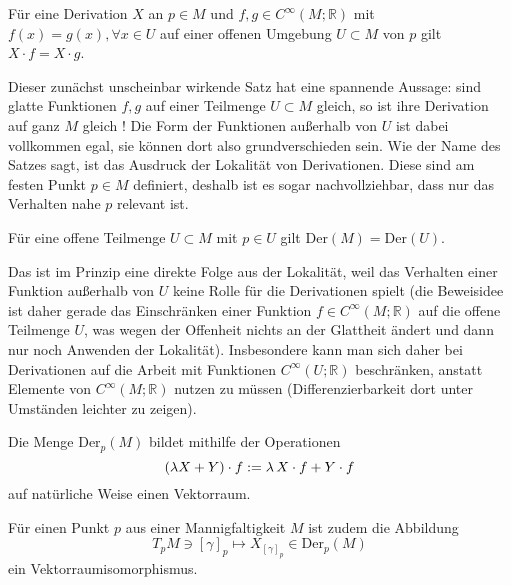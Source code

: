 \documentclass[../H_Analysis_main.tex]{subfiles}
\begin{document}
\begin{satz}[Lokalität]
Für eine Derivation $X$ an $p \in M$ und $f, g \in C^\infty(M; \mathbb{R})$ mit $f(x) = g(x), \forall x \in U$ auf einer offenen Umgebung $U \subset M$ von $p$ gilt $X \cdot f = X \cdot g$.
\end{satz}
Dieser zunächst unscheinbar wirkende Satz hat eine spannende Aussage: sind glatte Funktionen $f, g$ auf einer Teilmenge $U \subset M$ gleich, so ist ihre Derivation auf ganz $M$ gleich ! Die Form der Funktionen außerhalb von $U$ ist dabei vollkommen egal, sie können dort also grundverschieden sein. Wie der Name des Satzes sagt, ist das Ausdruck der Lokalität von Derivationen. Diese sind am festen Punkt $p \in M$ definiert, deshalb ist es sogar nachvollziehbar, dass nur das Verhalten nahe $p$ relevant ist.


\begin{cor}
Für eine offene Teilmenge $U \subset M$ mit $p \in U$ gilt $\text{Der}(M) = \text{Der}(U)$.
\end{cor}
Das ist im Prinzip eine direkte Folge aus der Lokalität, weil das Verhalten einer Funktion außerhalb von $U$ keine Rolle für die Derivationen spielt (die Beweisidee ist daher gerade das Einschränken einer Funktion $f \in C^\infty(M; \mathbb{R})$ auf die offene Teilmenge $U$, was wegen der Offenheit nichts an der Glattheit ändert und dann nur noch Anwenden der Lokalität). Insbesondere kann man sich daher bei Derivationen auf die Arbeit mit Funktionen $C^\infty(U; \mathbb{R})$ beschränken, anstatt Elemente von $C^\infty(M; \mathbb{R})$ nutzen zu müssen (Differenzierbarkeit dort unter Umständen leichter zu zeigen).

\begin{satz}
Die Menge $\text{Der}_p(M)$ bildet mithilfe der Operationen
\begin{equation}
\qty(\lambda X + Y) \cdot f := \lambda \, X \cdot f + Y \cdot f
\end{equation}
auf natürliche Weise einen Vektorraum.

Für einen Punkt $p$ aus einer Mannigfaltigkeit $M$ ist zudem die Abbildung
\begin{equation}
T_p M \ni [\gamma]_p \mapsto X_{[\gamma]_p} \in \text{Der}_p(M)
\end{equation}
ein Vektorraumisomorphismus.
\end{satz}
\end{document}
